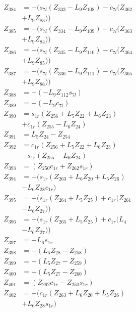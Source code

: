 \begin{multicols}{2}
\begin{align}
Z_{384} &= + (s_{7l}(Z_{333} - L_9Z_{108}) - c_{7l}(Z_{362}  \nonumber \\
&+ L_9Z_{83})) \nonumber \\
Z_{385} &= + (s_{7l}(Z_{334} - L_9Z_{109}) - c_{7l}(Z_{363}  \nonumber \\
&+ L_9Z_{84})) \nonumber \\
Z_{386} &= + (s_{7l}(Z_{335} - L_9Z_{110}) - c_{7l}(Z_{364}  \nonumber \\
&+ L_9Z_{85})) \nonumber \\
Z_{387} &= + (s_{7l}(Z_{336} - L_9Z_{111}) - c_{7l}(Z_{365}  \nonumber \\
&+ L_9Z_{86})) \nonumber \\
Z_{388} &= + (-L_9Z_{112}s_{7l}) \nonumber \\
Z_{389} &= + (-L_9c_{7l}) \nonumber \\
Z_{390} &= s_{1r}(Z_{256} + L_5Z_{22} + L_6Z_{23})  \nonumber \\
&+ c_{1r}(Z_{255} - L_6Z_{24}) \nonumber \\
Z_{391} &=                                                  L_5Z_{24} - Z_{254} \nonumber \\
Z_{392} &= c_{1r}(Z_{256} + L_5Z_{22} + L_6Z_{23})  \nonumber \\
&- s_{1r}(Z_{255} - L_6Z_{24}) \nonumber \\
Z_{393} &= (Z_{250}c_{1r} + Z_{262}s_{1r}) \nonumber \\
Z_{394} &= + (s_{1r}(Z_{263} + L_6Z_{20} + L_5Z_{26})  \nonumber \\
&- L_6Z_{28}c_{1r}) \nonumber \\
Z_{395} &= + (s_{1r}(Z_{264} + L_5Z_{25}) + c_{1r}(Z_{261}  \nonumber \\
&- L_6Z_{27})) \nonumber \\
Z_{396} &= + (s_{1r}(Z_{265} + L_5Z_{25}) + c_{1r}(L_4  \nonumber \\
&- L_6Z_{27})) \nonumber \\
Z_{397} &= - L_6s_{1r} \nonumber \\
Z_{398} &= + (L_5Z_{28} - Z_{258}) \nonumber \\
Z_{399} &= + (L_5Z_{27} - Z_{259}) \nonumber \\
Z_{400} &= + (L_5Z_{27} - Z_{260}) \nonumber \\
Z_{401} &= (Z_{262}c_{1r} - Z_{250}s_{1r}) \nonumber \\
Z_{402} &= + (c_{1r}(Z_{263} + L_6Z_{20} + L_5Z_{26})  \nonumber \\
&+ L_6Z_{28}s_{1r}) \nonumber \\

\end{align}
\end{multicols}
